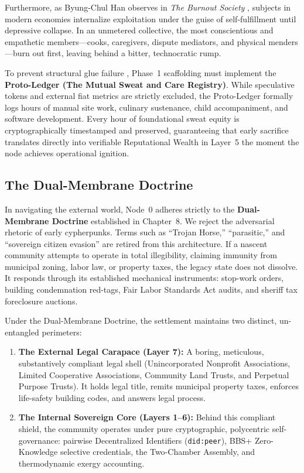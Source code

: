 Furthermore, as Byung-Chul Han observes in \textit{The Burnout Society} \parencite{han2015}, subjects in modern economies internalize exploitation under the guise of self-fulfillment until depressive collapse. In an unmetered collective, the most conscientious and empathetic members---cooks, caregivers, dispute mediators, and physical menders---burn out first, leaving behind a bitter, technocratic rump.

To prevent structural glue failure \parencite{christian2003}, Phase~1 scaffolding must implement the \textbf{Proto-Ledger (The Mutual Sweat and Care Registry)}. While speculative tokens and external fiat metrics are strictly excluded, the Proto-Ledger formally logs hours of manual site work, culinary sustenance, child accompaniment, and software development. Every hour of foundational sweat equity is cryptographically timestamped and preserved, guaranteeing that early sacrifice translates directly into verifiable Reputational Wealth in Layer~5 the moment the node achieves operational ignition.

\subsection{The Dual-Membrane Doctrine}
\label{subsec:dual_membrane}

In navigating the external world, Node~0 adheres strictly to the \textbf{Dual-Membrane Doctrine} established in Chapter~8. We reject the adversarial rhetoric of early cypherpunks. Terms such as ``Trojan Horse,'' ``parasitic,'' and ``sovereign citizen evasion'' are retired from this architecture. If a nascent community attempts to operate in total illegibility, claiming immunity from municipal zoning, labor law, or property taxes, the legacy state does not dissolve. It responds through its established mechanical instruments: stop-work orders, building condemnation red-tags, Fair Labor Standards Act audits, and sheriff tax foreclosure auctions.

Under the Dual-Membrane Doctrine, the settlement maintains two distinct, un-entangled perimeters:
\begin{enumerate}
    \item \textbf{The External Legal Carapace (Layer 7):} A boring, meticulous, substantively compliant legal shell (Unincorporated Nonprofit Associations, Limited Cooperative Associations, Community Land Trusts, and Perpetual Purpose Trusts). It holds legal title, remits municipal property taxes, enforces life-safety building codes, and answers legal process.
    \item \textbf{The Internal Sovereign Core (Layers 1--6):} Behind this compliant shield, the community operates under pure cryptographic, polycentric self-governance: pairwise Decentralized Identifiers (\texttt{did:peer}), BBS+ Zero-Knowledge selective credentials, the Two-Chamber Assembly, and thermodynamic exergy accounting.
\end{enumerate}

